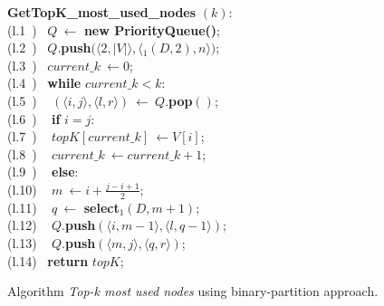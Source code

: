 \begin{itemize}[leftmargin=3mm]
	\begin{figure}[t]
		\begin{center}
			\begin{minipage}{0.70\textwidth}
				\begin{code}
					\textbf{GetTopK\_most\_used\_nodes} $(k)$: \\
					\>(l.1~) \> ~$ Q ~\leftarrow$ \textbf{new PriorityQueue()}; \\
					\>(l.2~) \> ~$ Q .$\textbf{push$(\langle2, |V|\rangle, \langle$\select$_1(D,2), n\rangle)$}; \\
					\>(l.3~) \> ~$ current\_k ~\leftarrow 0$; \\%
					
					\>(l.4~) \> ~\textbf{while }$current\_k < k$: \\
					\>(l.5~) \> ~\> $ (\langle i,j\rangle, \langle l,r\rangle) ~\leftarrow ~Q.$\textbf{pop$()$}; \\%
					
					\>(l.6~) \> ~\> \textbf{if} $i = j$: \\
					\>(l.7~) \> ~\> \> $ topK[current\_k] ~\leftarrow V[i]$; \\
					\>(l.8~) \> ~\> \> $ current\_k ~\leftarrow current\_k + 1$; \\
					\>(l.9~) \> ~\> \textbf{else}: \\
					\>(l.10) \> ~\> \> $ m ~\leftarrow i + \frac{j - i + 1}{2}$; \\
					\>(l.11) \> ~\> \> $ q ~\leftarrow$ \textbf{select$_1(D,m + 1)$}; \\
					\>(l.12) \> ~\> \> $ Q .$\textbf{push$(\langle i, m-1 \rangle, \langle l, q-1 \rangle)$}; \\
					\>(l.13) \> ~\> \> $ Q .$\textbf{push$(\langle m, j \rangle, \langle q, r \rangle)$}; \\%
					\>(l.14) \> ~\textbf{return} $topK$; \\
				\end{code}
			\end{minipage}
		\end{center}
		\vspace{-0.3cm}
		\caption{Algorithm {\em Top-k most used nodes} using binary-partition approach.}
		\label{fig:topk_nieves}
	\end{figure}


\end{itemize}
